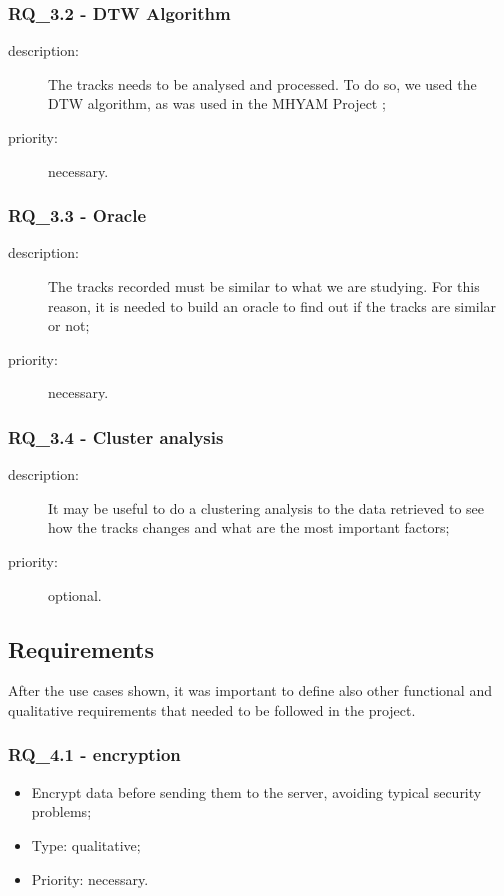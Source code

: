 \subsubsection{RQ\_3.2 - DTW Algorithm}

\begin{description}
	\item[description:] The tracks needs to be analysed and processed. To do so, we used the DTW algorithm, as was used in the MHYAM Project \cite{MHYAM};
	\item[priority:] necessary.
\end{description}

\subsubsection{RQ\_3.3 - Oracle}

\begin{description}
	\item[description:] The tracks recorded must be similar to what we are studying. For this reason, it is needed to build an oracle to find out if the tracks are similar or not;
	\item[priority:] necessary.
\end{description}

\subsubsection{RQ\_3.4 - Cluster analysis}

\begin{description}
	\item[description:] It may be useful to do a clustering analysis to the data retrieved to see how the tracks changes and what are the most important factors;
	\item[priority:] optional.
\end{description}

\subsection{Requirements}
\label{sec:requirements}
After the use cases shown, it was important to define also other functional and qualitative requirements that needed to be followed in the project.

\subsubsection{RQ\_4.1 - encryption}
	\begin{itemize}
		\item Encrypt data before sending them to the server, avoiding typical security problems;
		\item Type: qualitative;
		\item Priority: necessary.
	\end{itemize}
